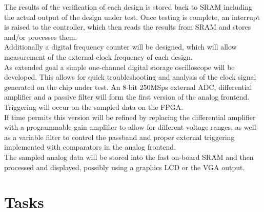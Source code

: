 \documentclass[a4paper,11pt]{report}
\begin{document}
The results of the verification of each design is stored back to SRAM including
the actual output of the design under test. Once testing is complete, an
interrupt is raised to the controller, which then reads the results from SRAM
and stores and/or processes them.
\\

Additionally a digital frequency counter will be designed, which will allow
measurement of the external clock frequency of each design.
\\

As extended goal a simple one-channel digital storage oscilloscope will be
developed. This allows for quick troubleshooting and analysis of the clock
signal generated on the chip under test. An 8-bit 250MSps external ADC,
differential amplifier and a passive filter will form the first version of the
analog frontend. Triggering will occur on the sampled data on the FPGA.
\\

If time permits this version will be
refined by replacing the differential amplifier with a programmable gain
amplifier to allow for different voltage ranges, as well as a variable filter to
control the passband and proper external triggering implemented with comparators
in the analog frontend.
\\

The sampled analog data will be stored into the fast on-board SRAM and then
processed and displayed, possibly using a graphics LCD or the VGA output.


\newpage
\section*{Tasks}
\vskip 1.5cm


\begin{gantt}{18}{10}
    \begin{ganttitle}
    \end{ganttitle}





  \end{gantt}
\end{document}
